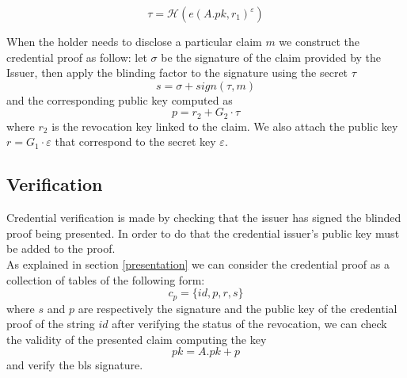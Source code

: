 \begin{equation}\label{tau_f}
    \tau = \mathcal{H}(e(A.pk, r_1)^{\varepsilon})
\end{equation}

When the holder needs to disclose a particular claim $m$ we construct the credential proof as follow:
let $\sigma$ be the signature of the claim provided by the Issuer, then apply the blinding factor to the signature using the secret $\tau$
\begin{equation}\label{claim.s}
    s = \sigma + sign(\tau, m)
\end{equation}
and the corresponding public key computed as
\begin{equation*}
    p = r_2 + G_2 \cdot \tau
\end{equation*}
where $r_2$ is the revocation key linked to the claim.
We also attach the public key $r = G_1 \cdot \varepsilon$ that correspond to the secret key $\varepsilon$.

\subsection{Verification}

Credential verification is made by checking that the issuer has signed the blinded proof being presented. In order to do that the credential issuer's public key must be added to the proof.\\
As explained in section \ref{presentation} we can consider the credential proof as a collection of tables of the following form:
\begin{equation*}
    c_p = \{id, p, r, s \}
\end{equation*}
where $s$ and $p$ are respectively the signature and the public key of the credential proof of the string $id$
after verifying the status of the revocation, we can check the validity of the presented claim computing the key
\begin{equation*}
    pk = A.pk + p
\end{equation*}
and verify the bls signature.

